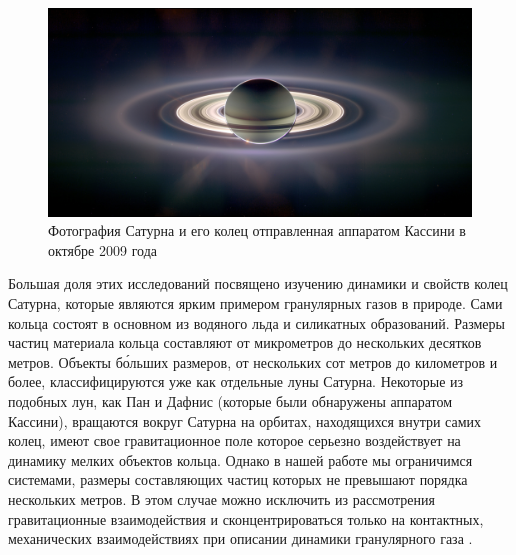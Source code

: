 \begin{figure}[ht]
    \centering
    \includegraphics[width=\textwidth]{figures/newrings_cassini_big.jpg}
    \caption{Фотография Сатурна и его колец отправленная аппаратом Кассини в октябре 2009 года}
    \label{fig:cassini_saturn_panorama}
\end{figure}

Большая доля этих исследований посвящено изучению динамики и свойств колец Сатурна, которые являются ярким примером гранулярных газов в природе. 
Сами кольца состоят в основном из водяного льда и силикатных образований. Размеры частиц материала кольца составляют от микрометров до нескольких 
десятков метров. Объекты б\'{о}льших размеров, от нескольких сот метров до километров и более, классифицируются уже как отдельные луны Сатурна. 
Некоторые из подобных лун, как Пан и Дафнис (которые были обнаружены аппаратом Кассини), вращаются вокруг Сатурна на орбитах, находящихся внутри самих колец, 
имеют свое гравитационное поле которое серьезно воздействует на динамику мелких объектов кольца. Однако в нашей работе мы ограничимся системами, 
размеры составляющих частиц которых не превышают порядка нескольких метров. 
В этом случае можно исключить из рассмотрения гравитационные взаимодействия и сконцентрироваться только на контактных, механических
взаимодействиях при описании динамики гранулярного газа 
\cite{Spahn:2000icarus_stability_analysis, Morishima:2006icarus_dense_ring_simul, Ohtsuki:1998icarus_vel_disp, WisdomTremaine:1988astro}.


